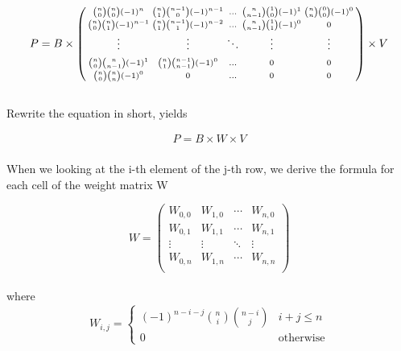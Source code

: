 \begin{gather*}
    P=B \times
    \begin{psmallmatrix*}
        {n \choose 0}{n \choose 0}(-1)^{n}   & {n \choose 1}{n-1 \choose 0}(-1)^{n-1}  & \hdots & {n \choose n-1}{1 \choose 0}(-1)^{1} & {n \choose n}{0 \choose 0}(-1)^{0} \\
        {n \choose 0}{n \choose 1}(-1)^{n-1} & {n \choose 1}{n-1 \choose 1}(-1)^{n-2}  & \hdots & {n \choose n-1}{1 \choose 1}(-1)^{0} & 0                                  \\
        \vdots                               & \vdots                                  & \ddots & \vdots                               & \vdots                             \\
        & \\
        {n \choose 0}{n \choose n-1}(-1)^{1} & {n \choose 1}{n-1 \choose n-1}(-1)^{0}  & \hdots & 0                                    & 0                                  \\
        {n \choose 0}{n \choose n}(-1)^{0}   & 0                                       & \hdots & 0                                    & 0
    \end{psmallmatrix*}
    \times
    V
\end{gather*}
\\
Rewrite the equation in short, yields

\begin{gather*}
    P=B \times W \times V
\end{gather*}
\\
When we looking at the i-th element of the j-th row, we derive the formula for each cell of the weight matrix W

\begin{equation*}
    W=
    \left(
    \begin{array}{cccc}
        W_{0,0} & W_{1,0} & \cdots & W_{n,0} \\
        W_{0,1} & W_{1,1} & \cdots & W_{n,1} \\
        \vdots  & \vdots  & \ddots & \vdots  \\
        W_{0,n} & W_{1,n} & \cdots & W_{n,n} \\
    \end{array}
    \right)
\end{equation*}
\\
where
\\
\begin{equation*}
    W_{i,j}=\begin{cases}
        (-1)^{n-i-j} {n \choose i}{n-i \choose j} & i + j \le n      \\
        0                                         & \text{otherwise}
    \end{cases}
\end{equation*}